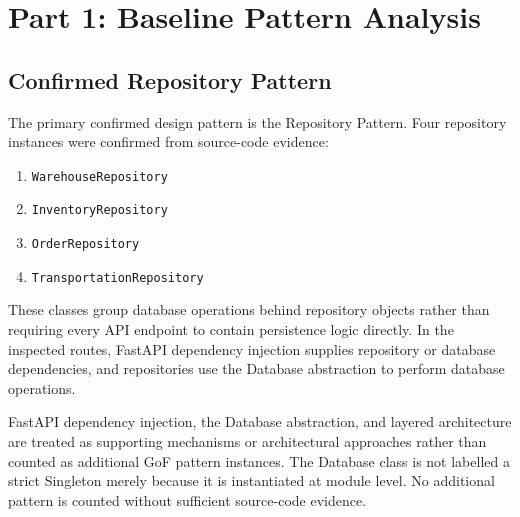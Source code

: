 \documentclass[12pt,a4paper]{article}
\begin{document}
\section{Part 1: Baseline Pattern Analysis}
\subsection{Confirmed Repository Pattern}
The primary confirmed design pattern is the Repository Pattern. Four repository instances were confirmed from source-code evidence:
\begin{enumerate}
    \item \texttt{WarehouseRepository}
    \item \texttt{InventoryRepository}
    \item \texttt{OrderRepository}
    \item \texttt{TransportationRepository}
\end{enumerate}

These classes group database operations behind repository objects rather than requiring every API endpoint to contain persistence logic directly. In the inspected routes, FastAPI dependency injection supplies repository or database dependencies, and repositories use the Database abstraction to perform database operations.

FastAPI dependency injection, the Database abstraction, and layered architecture are treated as supporting mechanisms or architectural approaches rather than counted as additional GoF pattern instances. The Database class is not labelled a strict Singleton merely because it is instantiated at module level. No additional pattern is counted without sufficient source-code evidence.
\end{document}
